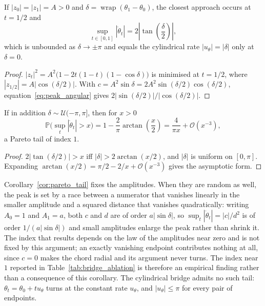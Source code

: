 \begin{corollary}
\label{cor:peak_equal_amplitude}
If $|z_0| = |z_1| = A > 0$ and $\delta = \operatorname{wrap}(\theta_1 - \theta_0)$, the closest approach occurs at $t = 1/2$ and
\begin{equation}
    \sup_{t \in [0,1]} |\dot{\theta}_t| = 2 \left| \tan\left( \frac{\delta}{2} \right) \right| ,
\end{equation}
which is unbounded as $\delta \to \pm\pi$ and equals the cylindrical rate $|u_\theta| = |\delta|$ only at $\delta = 0$.
\end{corollary}
\begin{proof}
$|z_t|^2 = A^2\big(1 - 2t(1-t)(1 - \cos\delta)\big)$ is minimised at $t = 1/2$, where $|z_{1/2}| = A|\cos(\delta/2)|$. With $c = A^2 \sin\delta = 2A^2 \sin(\delta/2)\cos(\delta/2)$, equation~\eqref{eq:peak_angular} gives $2|\sin(\delta/2)| / |\cos(\delta/2)|$.
\end{proof}

\begin{corollary}
\label{cor:pareto_tail}
If in addition $\delta \sim \mathcal{U}(-\pi, \pi]$, then for $x > 0$
\begin{equation}
    \mathbb{P}\Big( \sup_t |\dot{\theta}_t| > x \Big) = 1 - \frac{2}{\pi} \arctan\left(\frac{x}{2}\right) = \frac{4}{\pi x} + \mathcal{O}(x^{-3}),
\end{equation}
a Pareto tail of index $1$.
\end{corollary}
\begin{proof}
$2|\tan(\delta/2)| > x$ iff $|\delta| > 2\arctan(x/2)$, and $|\delta|$ is uniform on $[0, \pi]$. Expanding $\arctan(x/2) = \pi/2 - 2/x + \mathcal{O}(x^{-3})$ gives the asymptotic form.
\end{proof}

Corollary~\ref{cor:pareto_tail} fixes the amplitudes. When they are random as well, the peak is set by a race between a numerator that vanishes linearly in the smaller amplitude and a squared distance that vanishes quadratically: writing $A_0 = 1$ and $A_1 = a$, both $c$ and $d$ are of order $a |\sin \delta|$, so $\sup_t |\dot{\theta}_t| = |c| / d^2$ is of order $1 / (a |\sin \delta|)$ and small amplitudes enlarge the peak rather than shrink it. The index that results depends on the law of the amplitudes near zero and is not fixed by this argument; an exactly vanishing endpoint contributes nothing at all, since $c = 0$ makes the chord radial and its argument never turns. The index near $1$ reported in Table~\ref{tab:bridge_ablation} is therefore an empirical finding rather than a consequence of this corollary. The cylindrical bridge admits no such tail: $\theta_t = \theta_0 + t u_\theta$ turns at the constant rate $u_\theta$, and $|u_\theta| \le \pi$ for every pair of endpoints.


